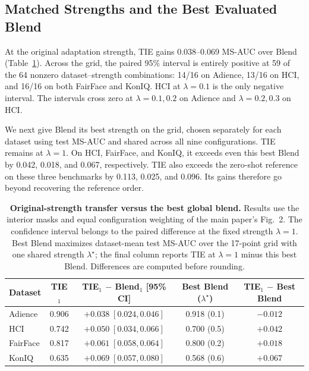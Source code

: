\subsection{Matched Strengths and the Best Evaluated Blend}
\label{sec:supp_best_blend}

At the original adaptation strength, TIE gains 0.038--0.069 MS-AUC over Blend (Table~\ref{tab:supp_best_blend}).
Across the grid, the paired 95\% interval is entirely positive at 59 of the 64 nonzero dataset--strength combinations: 14/16 on Adience, 13/16 on HCI, and 16/16 on both FairFace and KonIQ.
HCI at $\lambda=0.1$ is the only negative interval.
The intervals cross zero at $\lambda=0.1,0.2$ on Adience and $\lambda=0.2,0.3$ on HCI.

We next give Blend its best strength on the grid, chosen separately for each dataset using test MS-AUC and shared across all nine configurations.
TIE remains at $\lambda=1$.
On HCI, FairFace, and KonIQ, it exceeds even this best Blend by 0.042, 0.018, and 0.067, respectively.
TIE also exceeds the zero-shot reference on these three benchmarks by 0.113, 0.025, and 0.096.
Its gains therefore go beyond recovering the reference order.

\begin{table}[t]
\centering
\caption{\textbf{Original-strength transfer versus the best global blend.}
Results use the interior masks and equal configuration weighting of the main paper's Fig.~2.
The confidence interval belongs to the paired difference at the fixed strength $\lambda=1$.
Best Blend maximizes dataset-mean test MS-AUC over the 17-point grid with one shared strength $\lambda^\star$; the final column reports TIE at $\lambda=1$ minus this best Blend.
Differences are computed before rounding.}
\label{tab:supp_best_blend}
\small
\begin{tabular*}{\textwidth}{@{\extracolsep{\fill}}lcccc@{}}
\toprule
Dataset & TIE$_1$ & TIE$_1$ $-$ Blend$_1$ [95\% CI]
 & Best Blend ($\lambda^\star$) & TIE$_1$ $-$ Best Blend\\
\midrule
Adience  & 0.906 & $+0.038\;[0.024,0.046]$ & 0.918 (0.1) & $-0.012$\\
HCI      & 0.742 & $+0.050\;[0.034,0.066]$ & 0.700 (0.5) & $\mathbf{+0.042}$\\
FairFace & 0.817 & $+0.061\;[0.058,0.064]$ & 0.800 (0.2) & $\mathbf{+0.018}$\\
KonIQ    & 0.635 & $+0.069\;[0.057,0.080]$ & 0.568 (0.6) & $\mathbf{+0.067}$\\
\bottomrule
\end{tabular*}
\end{table}

